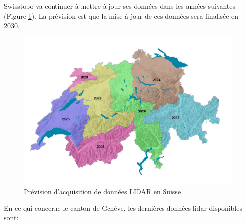Swisstopo va continuer à mettre à jour ses données dans les années suivantes (Figure \ref{fig:A1_18_swisstopo_prevision_lidar}). La prévision est que la mise à jour de ces données sera finalisée en 2030.

\begin{figure}[H]
    \centering
    \includegraphics[width=1\linewidth]{03-tail//A1_fondamentaux_ML//A1_figures/A1_18_swisstopo_prevision_lidar.png}
    \caption{Prévision d’acquisition de données LIDAR en Suisse \cite{swisstopo_acquisition_2024}}
    \label{fig:A1_18_swisstopo_prevision_lidar}
\end{figure}

\newpage
En ce qui concerne le canton de Genève, les dernières données \gls{lidar} \cite{sitg_nuages_2021} \cite{sitg_nuages_2023} disponibles sont:

